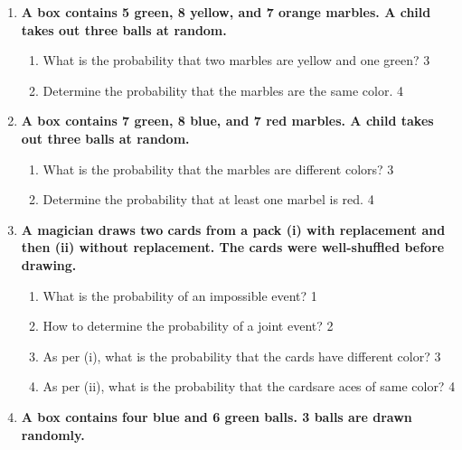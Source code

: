 \documentclass[a4paper,oneside, margin=1.4in]{book}
\begin{document}
\begin{enumerate}
  \begin{enumerate}
    \item  
	What is the probability that at least two balls are black? \hfill 3
    \item
	Whose expectation is more probable? Analyze.  \hfill 4
  \end{enumerate}
  
   \item
	  \textbf{A box contains 5 green, 8 yellow, and 7 orange marbles. A child takes out three balls at random.} 
  
  \begin{enumerate}
    \item  
	What is the probability that two marbles are yellow and one green? \hfill 3
    \item
	Determine the probability that the marbles are the same color. \hfill 4
  \end{enumerate}
  
     \item
	  \textbf{A box contains 7 green, 8 blue, and 7 red marbles. A child takes out three balls at random.} 
  
  \begin{enumerate}
    \item  
	What is the probability that the marbles are different colors? \hfill 3
    \item
	Determine the probability that at least one marbel is red. \hfill 4
  \end{enumerate}

 \item
	  \textbf{A magician draws two cards from a pack (i) with replacement and then (ii) without replacement. The cards were well-shuffled before drawing.} 
  
  \begin{enumerate}
    \item
	What is the probability of an impossible event? \hfill 1
    \item
	How to determine the probability of a joint event?  \hfill 2
    \item  
	As per (i), what is the probability that the cards have different color? \hfill 3
    \item
	As per (ii), what is the probability that the cardsare aces of same color?  \hfill 4
  \end{enumerate}

 \item
	  \textbf{A box contains four blue and 6 green balls. 3 balls are drawn randomly.} 
  

\end{enumerate}
\end{document}
